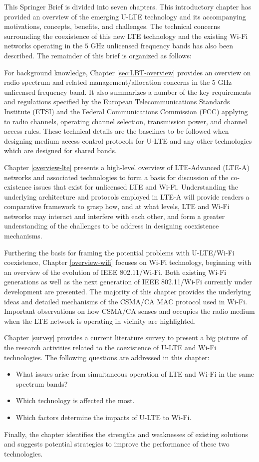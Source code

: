 This Springer Brief is divided into seven chapters. This introductory chapter has provided an overview of the emerging U-LTE technology and its accompanying motivations, concepts, benefits, and challenges. The technical concerns surrounding the coexistence of this new LTE technology and the existing Wi-Fi networks operating in the $5$ GHz unlicensed frequency bands has also been described. The remainder of this brief is organized as follows: 

For background knowledge, Chapter \ref{sec:LBT-overview} provides an overview on radio spectrum and related management/allocation concerns in the $5$ GHz unlicensed frequency band. It also summarizes a number of the key requirements and regulations specified by the European Telecommunications Standards Institute (ETSI) and the Federal Communications Commission (FCC) applying to radio channels, operating channel selection, transmission power, and channel access rules. These technical details are the baselines to be followed when designing medium access control protocols for U-LTE and any other technologies which are designed for shared bands.

Chapter \ref{overview-lte} presents a high-level overview of LTE-Advanced (LTE-A) networks and associated technologies to form a basis for discussion of the co-existence issues that exist for unlicensed LTE and Wi-Fi. Understanding the underlying architecture and protocols employed in LTE-A will provide readers a comparative framework to grasp how, and at what levels, LTE and Wi-Fi networks may interact and interfere with each other, and form a greater understanding of the challenges to be address in designing coexistence mechanisms.

Furthering the basis for framing the potential problems with U-LTE/Wi-Fi coexistence, Chapter \ref{overview-wifi} focuses on Wi-Fi technology, beginning with an overview of the evolution of IEEE 802.11/Wi-Fi. Both existing Wi-Fi generations as well as the next generation of IEEE 802.11/Wi-Fi currently under development are presented. The majority of this chapter provides the underlying ideas and detailed mechanisms of the CSMA/CA MAC protocol used in Wi-Fi. Important observations on how CSMA/CA senses and occupies the radio medium when the LTE network is operating in vicinity are highlighted.

Chapter \ref{survey} provides a current literature survey to present a big picture of the research activities related to the coexistence of U-LTE and Wi-Fi technologies. The following questions are addressed in this chapter: 
\begin{itemize}
\item What issues arise from simultaneous operation of LTE and Wi-Fi in the same spectrum bands? 
\item Which technology is affected the most. 
\item Which factors determine the impacts of U-LTE to Wi-Fi. 
\end{itemize}Finally, the chapter identifies the strengths and weaknesses of existing solutions and suggests potential strategies to improve the performance of these two technologies.

